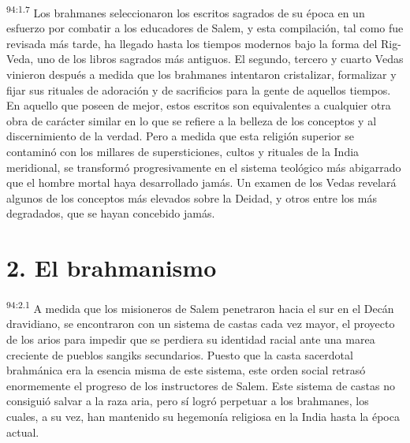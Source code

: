 \par
\textsuperscript{94:1.7} Los brahmanes seleccionaron los escritos sagrados de su época en un esfuerzo por combatir a los educadores de Salem, y esta compilación, tal como fue revisada más tarde, ha llegado hasta los tiempos modernos bajo la forma del Rig-Veda, uno de los libros sagrados más antiguos. El segundo, tercero y cuarto Vedas vinieron después a medida que los brahmanes intentaron cristalizar, formalizar y fijar sus rituales de adoración y de sacrificios para la gente de aquellos tiempos. En aquello que poseen de mejor, estos escritos son equivalentes a cualquier otra obra de carácter similar en lo que se refiere a la belleza de los conceptos y al discernimiento de la verdad. Pero a medida que esta religión superior se contaminó con los millares de supersticiones, cultos y rituales de la India meridional, se transformó progresivamente en el sistema teológico más abigarrado que el hombre mortal haya desarrollado jamás. Un examen de los Vedas revelará algunos de los conceptos más elevados sobre la Deidad, y otros entre los más degradados, que se hayan concebido jamás.

\section*{2. El brahmanismo}
\par
\textsuperscript{94:2.1} A medida que los misioneros de Salem penetraron hacia el sur en el Decán dravidiano, se encontraron con un sistema de castas cada vez mayor, el proyecto de los arios para impedir que se perdiera su identidad racial ante una marea creciente de pueblos sangiks secundarios. Puesto que la casta sacerdotal brahmánica era la esencia misma de este sistema, este orden social retrasó enormemente el progreso de los instructores de Salem. Este sistema de castas no consiguió salvar a la raza aria, pero sí logró perpetuar a los brahmanes, los cuales, a su vez, han mantenido su hegemonía religiosa en la India hasta la época actual.

